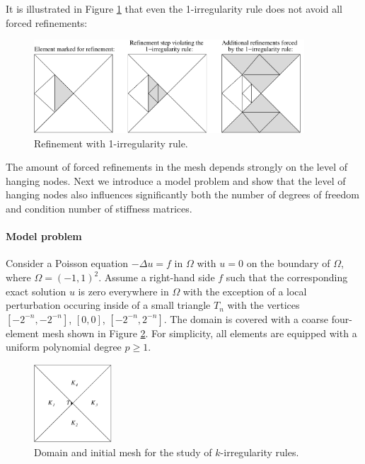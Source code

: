 It is illustrated in Figure \ref{fig:one_irr} that even the
1-irregularity rule does not avoid all forced refinements:
\begin{figure}[h!]
\centering
\includegraphics[width=0.9\textwidth]{img/one-irr}
\caption{Refinement with 1-irregularity rule.}
\label{fig:one_irr}
\end{figure}

The amount of forced refinements
in the mesh depends strongly on the level of hanging nodes.
Next we introduce a model problem and show that the level of
hanging nodes also influences significantly both the number of degrees of freedom and condition number of stiffness matrices.

\paragraph{Model problem}

Consider a Poisson equation $-\Delta u = f$ in $\Omega$ with $u = 0$ on
the boundary of $\Omega$, where $\Omega = (-1,1)^2$.
Assume a right-hand side $f$ such that the corresponding
exact solution $u$ is zero everywhere in $\Omega$ with the exception of
a local perturbation occuring inside of a small triangle $T_n$ with the vertices
$[-2^{-n}, -2^{-n}]$, $[0,0]$, $[-2^{-n}, 2^{-n}]$.
The domain is covered with a coarse four-element mesh shown in Figure \ref{fig:academic}.
For simplicity, all elements are equipped with a uniform polynomial degree $p \ge 1$.
\begin{figure}[h!]
\centering
\includegraphics[width=0.26\textwidth]{img/academic}
\caption{Domain and initial mesh for the study of $k$-irregularity rules.}
\label{fig:academic}
\end{figure}

